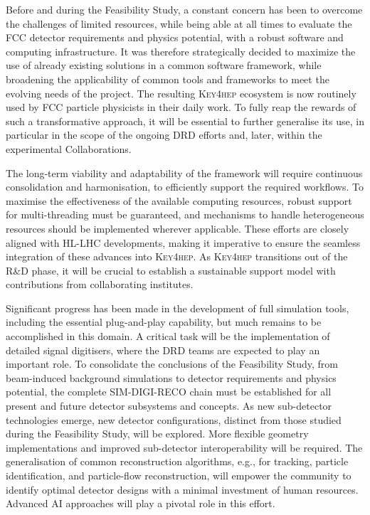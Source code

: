 Before and during the Feasibility Study, a constant concern has been to overcome the challenges of limited resources, 
while being able at all times to evaluate the FCC detector requirements and physics potential, 
with a robust software and computing infrastructure. 
It was therefore strategically decided to maximize the use of already existing solutions in a common software framework, 
while broadening the applicability of common tools and frameworks to meet the evolving needs of the project. 
The resulting \textsc{Key4hep} ecosystem is now routinely used by FCC particle physicists in their daily work. 
To fully reap the rewards of such a transformative approach, it will be essential to further generalise its use, 
in particular in the scope of the ongoing DRD efforts and, later, within the experimental Collaborations.

The long-term viability and adaptability of the framework will require continuous consolidation and harmonisation, 
to efficiently support the required workflows. 
To maximise the effectiveness of the available computing resources, 
robust support for multi-threading must be guaranteed, 
and mechanisms to handle heterogeneous resources should be implemented wherever applicable. 
These efforts are closely aligned with HL-LHC developments, 
making it imperative to ensure the seamless integration of these advances into \textsc{Key4hep}. 
As \textsc{Key4hep} transitions out of the R\&D phase, 
it will be crucial to establish a sustainable support model with contributions from collaborating institutes. 

Significant progress has been made in the development of full simulation tools, 
including the essential plug-and-play capability, 
but much remains to be accomplished in this domain. 
A critical task will be the implementation of detailed signal digitisers, 
where the DRD teams are expected to play an important role. 
To consolidate the conclusions of the Feasibility Study, 
from beam-induced background simulations to detector requirements and physics potential, 
the complete SIM-DIGI-RECO chain must be established for all present and future detector subsystems and concepts.   
As new sub-detector technologies emerge, new detector configurations, distinct from those studied during the Feasibility Study, will be explored. 
More flexible geometry implementations and improved sub-detector interoperability will be required. 
The generalisation of common reconstruction algorithms, e.g., for tracking, particle identification, and particle-flow reconstruction, 
will empower the community to identify optimal detector designs with a minimal investment of human resources. 
Advanced AI approaches will play a pivotal role in this effort.


